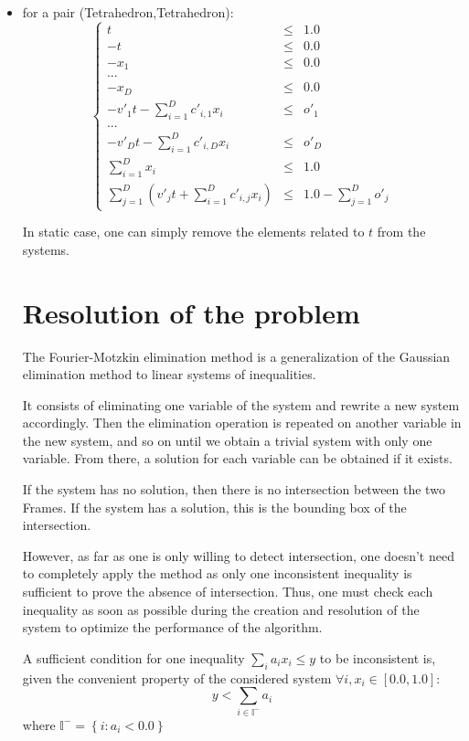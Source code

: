 \documentclass[12pt, a4paper]{article}
\begin{document}
\begin{itemize}
\item for a pair (Tetrahedron,Tetrahedron):
\begin{equation}
\left\lbrace
\begin{array}{rcl}
t&\le&1.0\\
-t&\le&0.0\\
-x_1&\le&0.0\\
...\\
-x_D&\le&0.0\\
-v'_1t-\sum_{i=1}^Dc'_{i,1}x_i&\le&o'_1\\
...\\
-v'_Dt-\sum_{i=1}^Dc'_{i,D}x_i&\le&o'_D\\
\sum_{i=1}^Dx_i&\le&1.0\\
\sum_{j=1}^D\left(v'_jt+\sum_{i=1}^Dc'_{i,j}x_i\right)&\le&1.0-\sum_{j=1}^Do'_j
\end{array}
\right.
\end{equation}

In static case, one can simply remove the elements related to $t$ from the systems.

\section{Resolution of the problem}
\label{sec:resolution}

The Fourier-Motzkin elimination method is a generalization of the Gaussian elimination method to linear systems of inequalities.

It consists of eliminating one variable of the system and rewrite a new system accordingly. Then the elimination operation is repeated on another variable in the new system, and so on until we obtain a trivial system with only one variable. From there, a solution for each variable can be obtained if it exists.

If the system has no solution, then there is no intersection between the two Frames. If the system has a solution, this is the bounding box of the intersection.

However, as far as one is only willing to detect intersection, one doesn't need to completely apply the method as only one inconsistent inequality is sufficient to prove the absence of intersection. Thus, one must check each inequality as soon as possible during the creation and resolution of the system to optimize the performance of the algorithm.

A sufficient condition for one inequality $\sum_ia_ix_i\le y$ to be inconsistent is, given the convenient property of the considered system $\forall i,x_i\in[0.0,1.0]$:
\begin{equation}
\label{eqn:cond_non_intersec}
y<\sum_{i\in \mathbb{I^-}}a_i
\end{equation}
where $\mathbb{I^-}=\left\lbrace i:a_i<0.0\right\rbrace$


\end{itemize}
\end{document}

